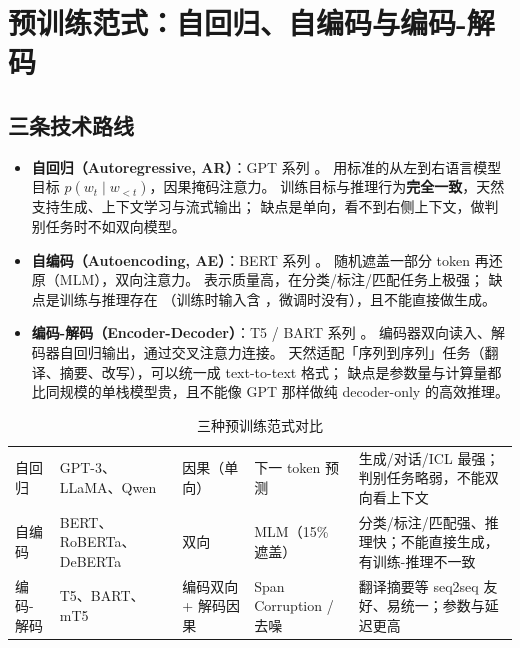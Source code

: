 \section{预训练范式：自回归、自编码与编码-解码}
\label{sec:nlp-paradigm}

\subsection{三条技术路线}

\begin{itemize}
  \item \textbf{自回归（Autoregressive, AR）}：GPT 系列 \cite{radford2019gpt2,brown2020gpt3}。
        用标准的从左到右语言模型目标 $p(w_t \mid w_{<t})$，因果掩码注意力。
        训练目标与推理行为\textbf{完全一致}，天然支持生成、上下文学习与流式输出；
        缺点是单向，看不到右侧上下文，做判别任务时不如双向模型。
  \item \textbf{自编码（Autoencoding, AE）}：BERT 系列 \cite{devlin2019bert,liu2019roberta}。
        随机遮盖一部分 token 再还原（MLM），双向注意力。
        表示质量高，在分类/标注/匹配任务上极强；
        缺点是训练与推理存在
        （训练时输入含 \code{[MASK]}，微调时没有），且不能直接做生成。
  \item \textbf{编码-解码（Encoder-Decoder）}：T5 / BART 系列 \cite{raffel2020t5}。
        编码器双向读入、解码器自回归输出，通过交叉注意力连接。
        天然适配「序列到序列」任务（翻译、摘要、改写），可以统一成 text-to-text 格式；
        缺点是参数量与计算量都比同规模的单栈模型贵，且不能像 GPT 那样做纯 decoder-only 的高效推理。
\end{itemize}

\begin{table}[htbp]
\centering
\caption{三种预训练范式对比}
\label{tab:paradigm-compare}
\small
\begin{tabularx}{\textwidth}{L{1.9cm} L{1.9cm} L{1.9cm} L{1.9cm} Y}
\toprule
{} &  &  &  &  \\
\midrule
自回归 & GPT-3、LLaMA、Qwen & 因果（单向） & 下一 token 预测 & 生成/对话/ICL 最强；判别任务略弱，不能双向看上下文 \\
\addlinespace
自编码 & BERT、RoBERTa、DeBERTa & 双向 & MLM（15\% 遮盖） & 分类/标注/匹配强、推理快；不能直接生成，有训练-推理不一致 \\
\addlinespace
编码-解码 & T5、BART、mT5 & 编码双向 + 解码因果 & Span Corruption / 去噪 & 翻译摘要等 seq2seq 友好、易统一；参数与延迟更高 \\
\bottomrule
\end{tabularx}
\end{table}

